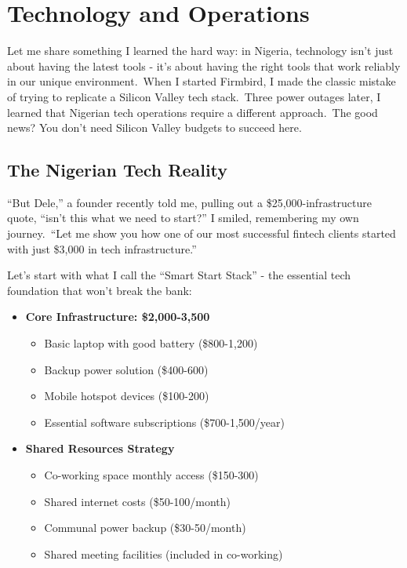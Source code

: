 \chapter{Technology and Operations}\label{ch:technology-and-operations}

\begin{importantbox}
Let me share something I learned the hard way: in Nigeria, technology isn't just about having the latest tools - it's about having the right tools that work reliably in our unique environment.\ When I started Firmbird, I made the classic mistake of trying to replicate a Silicon Valley tech stack.\ Three power outages later, I learned that Nigerian tech operations require a different approach.\ The good news? You don't need Silicon Valley budgets to succeed here.
\end{importantbox}

\section{The Nigerian Tech Reality}\label{sec:nigerian-tech-reality}

``But Dele,'' a founder recently told me, pulling out a \$25,000-infrastructure quote, ``isn't this what we need to start?'' I smiled, remembering my own journey.\ ``Let me show you how one of our most successful fintech clients started with just \$3,000 in tech infrastructure.''

Let's start with what I call the ``Smart Start Stack'' - the essential tech foundation that won't break the bank:

\begin{itemize}
    \item \textbf{Core Infrastructure: \$2,000-3,500}
    \begin{itemize}
        \item Basic laptop with good battery (\$800-1,200)
        \item Backup power solution (\$400-600)
        \item Mobile hotspot devices (\$100-200)
        \item Essential software subscriptions (\$700-1,500/year)
    \end{itemize}

    \item \textbf{Shared Resources Strategy}
    \begin{itemize}
        \item Co-working space monthly access (\$150-300)
        \item Shared internet costs (\$50-100/month)
        \item Communal power backup (\$30-50/month)
        \item Shared meeting facilities (included in co-working)
    \end{itemize}
\end{itemize}

